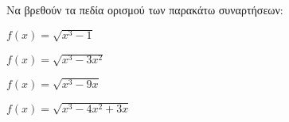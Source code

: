 Να βρεθούν τα πεδία ορισμού των παρακάτω συναρτήσεων:
\begin{alist}
\item $ f(x)=\sqrt{x^3-1} $
\item $ f(x)=\sqrt{x^3-3x^2} $
\item $ f(x)=\sqrt{x^3-9x} $
\item $ f(x)=\sqrt{x^3-4x^2+3x} $
\end{alist}
